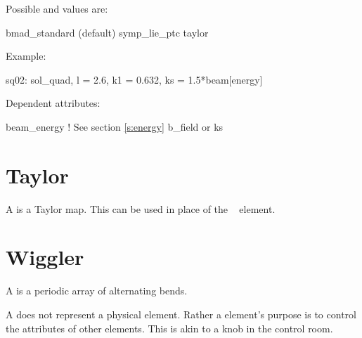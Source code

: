 \vskip0.2in \noindent
Possible  and  values are:
\vskip 0.01in
\begin{example}
  bmad\_standard  (default)
  symp\_lie\_ptc
  taylor
\end{example}

\vskip0.2in \noindent
Example:
\begin{example}
  sq02: sol_quad, l = 2.6, k1 = 0.632, ks = 1.5*beam[energy]
\end{example}

\vskip0.2in \noindent
Dependent attributes:
\begin{example}
  beam\_energy  ! See section \ref{s:energy}
  b\_field or ks
\end{example}


\section{Taylor}
\label{s:tay}

A  is a Taylor map. This can be used in place of the \mad\ 
 element.

\section{Wiggler} 
\label{s:wig}

A  is a periodic array of alternating bends.




A  does not represent a physical element. Rather a
\vn{Group} element's purpose is to control the attributes of other elements.
This is akin to a knob in the control room.